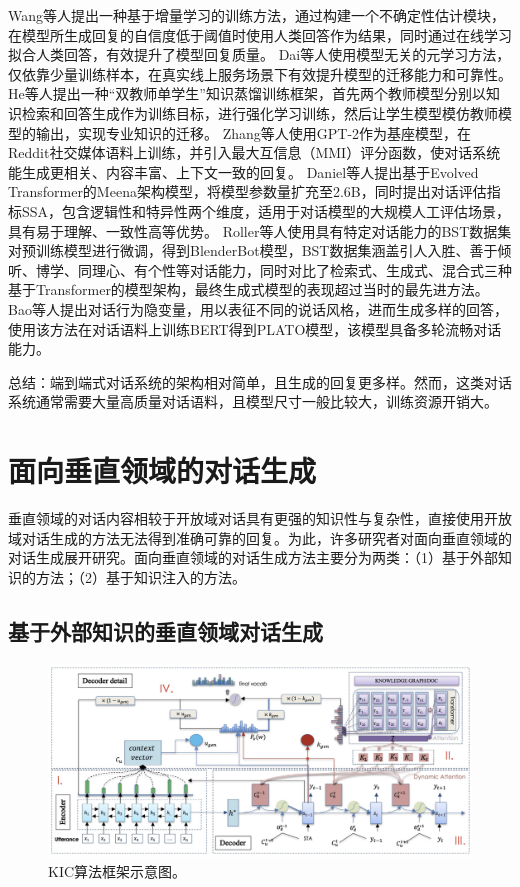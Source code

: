 Wang等人\cite{DBLP:conf/acl/WangZLHZL19}提出一种基于增量学习的训练方法，通过构建一个不确定性估计模块，在模型所生成回复的自信度低于阈值时使用人类回答作为结果，同时通过在线学习拟合人类回答，有效提升了模型回复质量。
Dai等人\cite{DBLP:conf/acl/DaiLTLSZ20}使用模型无关的元学习方法，仅依靠少量训练样本，在真实线上服务场景下有效提升模型的迁移能力和可靠性。
He等人\cite{DBLP:conf/emnlp/HeYYLSX20}提出一种“双教师单学生”知识蒸馏训练框架，首先两个教师模型分别以知识检索和回答生成作为训练目标，进行强化学习训练，然后让学生模型模仿教师模型的输出，实现专业知识的迁移。
Zhang等人\cite{DBLP:conf/acl/ZhangSGCBGGLD20}使用GPT-2\cite{radford2019language}作为基座模型，在Reddit社交媒体语料上训练，并引入最大互信息（MMI）评分函数，使对话系统能生成更相关、内容丰富、上下文一致的回复。
Daniel等人\cite{DBLP:journals/corr/abs-2001-09977}提出基于Evolved Transformer的Meena架构模型，将模型参数量扩充至2.6B，同时提出对话评估指标SSA，包含逻辑性和特异性两个维度，适用于对话模型的大规模人工评估场景，具有易于理解、一致性高等优势。
Roller等人\cite{DBLP:conf/eacl/RollerDGJWLXOSB21}使用具有特定对话能力的BST数据集对预训练模型进行微调，得到BlenderBot模型，BST数据集涵盖引人入胜、善于倾听、博学、同理心、有个性等对话能力，同时对比了检索式、生成式、混合式三种基于Transformer的模型架构，最终生成式模型的表现超过当时的最先进方法。
Bao等人\cite{DBLP:conf/acl/BaoHWWW20}提出对话行为隐变量，用以表征不同的说话风格，进而生成多样的回答，使用该方法在对话语料上训练BERT得到PLATO模型，该模型具备多轮流畅对话能力。

总结：端到端式对话系统的架构相对简单，且生成的回复更多样。然而，这类对话系统通常需要大量高质量对话语料，且模型尺寸一般比较大，训练资源开销大。

\section{面向垂直领域的对话生成}

垂直领域的对话内容相较于开放域对话具有更强的知识性与复杂性，直接使用开放域对话生成的方法无法得到准确可靠的回复。为此，许多研究者对面向垂直领域的对话生成展开研究。面向垂直领域的对话生成方法主要分为两类：（1）基于外部知识的方法；（2）基于知识注入的方法。

\subsection{基于外部知识的垂直领域对话生成}

\begin{figure}[htbp]
	\centering
	\includegraphics[scale=0.5]{Fig/KIC.png}
	\caption{\label{kic_architecture}KIC算法框架示意图\cite{DBLP:conf/acl/LinJHWC20}。}
\end{figure}

